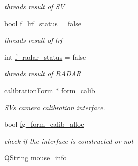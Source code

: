 \begin{DoxyCompactItemize}
\begin{DoxyCompactList}\small\item\em thread\textquotesingle{}s result of S\+V \end{DoxyCompactList}\item 
\hypertarget{class_main_window_a3724b9a7963fa667a366823194e41a43}{}bool \hyperlink{class_main_window_a3724b9a7963fa667a366823194e41a43}{f\+\_\+lrf\+\_\+status} = false\label{class_main_window_a3724b9a7963fa667a366823194e41a43}

\begin{DoxyCompactList}\small\item\em thread\textquotesingle{}s result of lrf \end{DoxyCompactList}\item 
\hypertarget{class_main_window_ae777ce7e4b31247a1d35c251d458f3c3}{}int \hyperlink{class_main_window_ae777ce7e4b31247a1d35c251d458f3c3}{f\+\_\+radar\+\_\+status} = false\label{class_main_window_ae777ce7e4b31247a1d35c251d458f3c3}

\begin{DoxyCompactList}\small\item\em thread\textquotesingle{}s result of R\+A\+D\+A\+R \end{DoxyCompactList}\item 
\hypertarget{class_main_window_ae807b3bfce87e184f1951c2b7874755c}{}\hyperlink{classcalibration_form}{calibration\+Form} $\ast$ \hyperlink{class_main_window_ae807b3bfce87e184f1951c2b7874755c}{form\+\_\+calib}\label{class_main_window_ae807b3bfce87e184f1951c2b7874755c}

\begin{DoxyCompactList}\small\item\em S\+V\textquotesingle{}s camera calibration interface. \end{DoxyCompactList}\item 
\hypertarget{class_main_window_a1e66a6f5c73e43fedc1a9974807357a9}{}bool \hyperlink{class_main_window_a1e66a6f5c73e43fedc1a9974807357a9}{fg\+\_\+form\+\_\+calib\+\_\+alloc}\label{class_main_window_a1e66a6f5c73e43fedc1a9974807357a9}

\begin{DoxyCompactList}\small\item\em check if the interface is constructed or not \end{DoxyCompactList}\item 
\hypertarget{class_main_window_ac3c1675b721a495c17b935049134f936}{}Q\+String \hyperlink{class_main_window_ac3c1675b721a495c17b935049134f936}{mouse\+\_\+info}\label{class_main_window_ac3c1675b721a495c17b935049134f936}


\end{DoxyCompactItemize}
